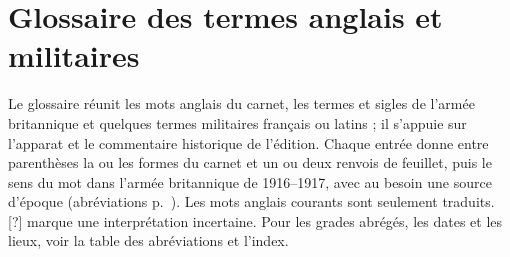 \section{Glossaire des termes anglais et militaires}
\label{annexe-glossaire}
\begingroup
\footnotesize
\newcommand*{\Gr}[1]{#1~r\textsuperscript{o}}%
\newcommand*{\Gv}[1]{#1~v\textsuperscript{o}}%
\newcommand{\Gf}[1]{{\LJpolice #1}}%
\newcommand{\Ge}[3]{\par\noindent\hangindent=1em\hangafter=1
  \textbf{#1}\ (#2)~--- #3\par}%

Le glossaire réunit les mots anglais du carnet, les termes et sigles de l'armée britannique et quelques termes militaires français ou latins ; il s'appuie sur l'apparat et le commentaire historique de l'édition. Chaque entrée donne entre parenthèses la ou les formes du carnet et un ou deux renvois de feuillet, puis le sens du mot dans l'armée britannique de 1916--1917, avec au besoin une source d'époque (abréviations p.~\pageref{annexe-bibliographie}). Les mots anglais courants sont seulement traduits. [?] marque une interprétation incertaine. Pour les grades abrégés, les dates et les lieux, voir la table des abréviations et l'index.
\setlength{\parindent}{0pt}%
\setlength{\parskip}{1.2pt plus 0.6pt}%

